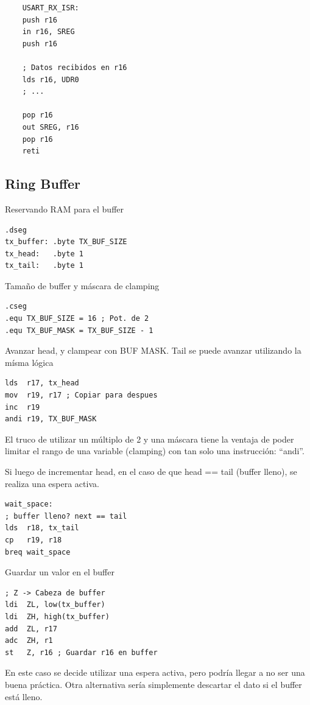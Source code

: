     \begin{verbatim}
    USART_RX_ISR:
    push r16 
    in r16, SREG 
    push r16 

    ; Datos recibidos en r16
    lds r16, UDR0
    ; ...

    pop r16
    out SREG, r16
    pop r16	
    reti
    \end{verbatim}

\subsection{Ring Buffer}

Reservando RAM para el buffer
\begin{verbatim}
.dseg 
tx_buffer: .byte TX_BUF_SIZE  
tx_head:   .byte 1            
tx_tail:   .byte 1
\end{verbatim}

Tamaño de buffer y máscara de clamping
\begin{verbatim}
.cseg
.equ TX_BUF_SIZE = 16 ; Pot. de 2
.equ TX_BUF_MASK = TX_BUF_SIZE - 1
\end{verbatim}

Avanzar head, y clampear con BUF MASK. Tail se puede avanzar utilizando la mísma lógica
\begin{verbatim}
lds  r17, tx_head
mov  r19, r17 ; Copiar para despues
inc  r19
andi r19, TX_BUF_MASK
\end{verbatim}

El truco de utilizar un múltiplo de 2 y una máscara tiene la ventaja de poder limitar el rango de una variable (clamping) con tan solo una instrucción: ``andi''. 

Si luego de incrementar head, en el caso de que head == tail (buffer lleno), se realiza una espera activa. 
\begin{verbatim}
wait_space: 
; buffer lleno? next == tail
lds  r18, tx_tail
cp   r19, r18
breq wait_space
\end{verbatim}

Guardar un valor en el buffer
\begin{verbatim}
; Z -> Cabeza de buffer
ldi  ZL, low(tx_buffer)
ldi  ZH, high(tx_buffer)
add  ZL, r17 
adc  ZH, r1
st   Z, r16 ; Guardar r16 en buffer
\end{verbatim}

En este caso se decide utilizar una espera activa, pero podría llegar a no ser una buena práctica. Otra alternativa sería simplemente descartar el dato si el buffer está lleno.

    

